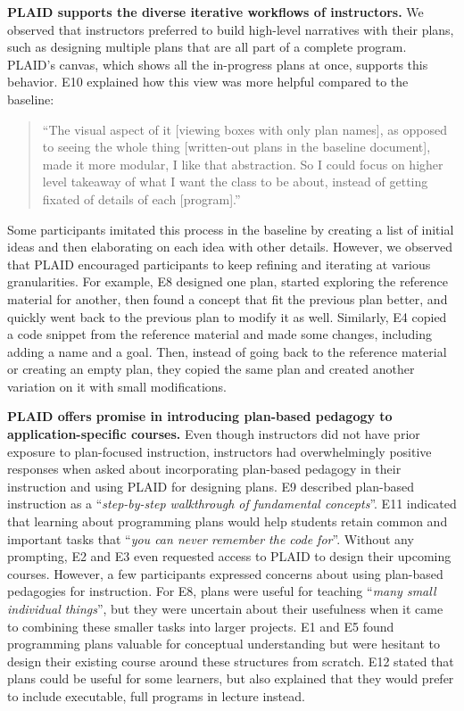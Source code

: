 \textbf{PLAID supports the diverse iterative workflows of instructors.} We observed that instructors preferred to build high-level narratives with their plans, such as designing multiple plans that are all part of a complete program. PLAID's canvas, which shows all the in-progress plans at once, supports this behavior. E10 explained how this view was more helpful compared to the baseline: \begin{quote}
    ``The visual aspect of it [viewing boxes with only plan names], as opposed to seeing the whole thing [written-out plans in the baseline document], made it more modular, I like that abstraction. So I could focus on higher level takeaway of what I want the class to be about, instead of getting fixated of details of each [program].''
\end{quote}
Some participants imitated this process in the baseline by creating a list of initial ideas and then elaborating on each idea with other details. However, we observed that PLAID encouraged participants to keep refining and iterating at various granularities. For example, E8 designed one plan, started exploring the reference material for another, then found a concept that fit the previous plan better, and quickly went back to the previous plan to modify it as well. Similarly, E4 copied a code snippet from the reference material and made some changes, including adding a name and a goal. Then, instead of going back to the reference material or creating an empty plan, they copied the same plan and created another variation on it with small modifications.

\textbf{PLAID offers promise in introducing plan-based pedagogy to application-specific courses.}
Even though instructors did not have prior exposure to plan-focused instruction, instructors had overwhelmingly positive responses when asked about incorporating plan-based pedagogy in their instruction and using PLAID for designing plans. E9 described plan-based instruction as a ``\textit{step-by-step walkthrough of fundamental concepts}''. E11 indicated that learning about programming plans would help students retain common and important tasks that ``\textit{you can never remember the code for}''. Without any prompting, E2 and E3 even requested access to PLAID to design their upcoming courses.
However, a few participants expressed concerns about using plan-based pedagogies for instruction. For E8, plans were useful for teaching ``\textit{many small individual things}'', but they were uncertain about their usefulness when it came to combining these smaller tasks into larger projects. E1 and E5 found programming plans valuable for conceptual understanding but were hesitant to design their existing course around these structures from scratch. E12 stated that plans could be useful for some learners, but also explained that they would prefer to include executable, full programs in lecture instead.


